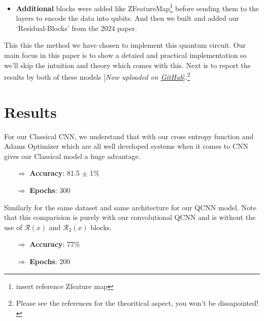 \documentclass[a4paper]{article}
\begin{document}
\begin{itemize}
\begin{figure}[h]
\begin{subfigure}{.2\textwidth}
  \caption{$\mathcal{R}_2(x)$}
  \label{fig:sub2}
\end{subfigure}%
\begin{subfigure}{.2\textwidth}
  \centering
  \texttt{[image: assets/conv\\\_element.png]}
  \caption{$C$ Layer element}
  \label{fig:sub2}
\end{subfigure}%
\begin{subfigure}{.2\textwidth}
  \centering
  \texttt{[image: assets/pool\\\_element.png]}
  \caption{$P$ Layer element}
  \label{fig:sub2}
\end{subfigure}%
\label{fig:test}
\end{figure}
\item \textbf{Additional} blocks were added like ZFeatureMap\footnote{insert reference Zfeature map} before sending them to the layers to encode the data into qubits. And then we built and added our `Residual-Blocks' from the 2024 paper.
\end{itemize}
This this the method we have chosen to implement this quantum circuit. Our main focus in this paper is to show a detaied and practical implementation so we'll skip the intuition and theory which comes with this. Next is to report the results by both of these models [\emph{Now uploaded on \href{https://github.com/f361015/Quantum-CNN-TicTacToe}{GitHub}}].\footnote{Please see the references for the theoritical aspect, you won't be dissapointed!}

\section*{Results}

For our Classical CNN, we understand that with our cross entropy function and Adams Optimizer which are all well developed systems when it comes to CNN gives our Classical model a huge advantage.

\begin{itemize}
\item[$\Rightarrow$] \textbf{Accuracy}: 81.5 $\pm$ 1\%
\item[$\Rightarrow$] \textbf{Epochs}: 300
\end{itemize}

Similarly for the same dataset and same architecture for our QCNN model. Note that this comparision is purely with our convolutional QCNN and is without the use of $\mathcal{R}(x)$ and $\mathcal{R}_2(x)$ blocks.

\begin{itemize}
\item[$\Rightarrow$] \textbf{Accuracy}: 77\%
\item[$\Rightarrow$] \textbf{Epochs}: 200
\end{itemize}
\newpage
\end{document}
